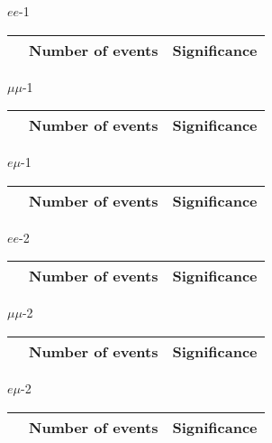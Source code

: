 \begin{frame}{$ee$-1}
\vspace{5mm}
\begin{tabular}{|c|c|c|}
\hline
& Number of events & Significance \\
\hline

\end{tabular}
\end{frame}

\begin{frame}{$\mu\mu$-1}
\vspace{5mm}
\begin{tabular}{|c|c|c|}
\hline
& Number of events & Significance \\
\hline

\end{tabular}
\end{frame}

\begin{frame}{$e\mu$-1}
\vspace{5mm}
\begin{tabular}{|c|c|c|}
\hline
& Number of events & Significance \\
\hline

\end{tabular}
\end{frame}

\begin{frame}{$ee$-2}
\vspace{5mm}
\begin{tabular}{|c|c|c|}
\hline
& Number of events & Significance \\
\hline

\end{tabular}
\end{frame}

\begin{frame}{$\mu\mu$-2}
\vspace{5mm}
\begin{tabular}{|c|c|c|}
\hline
& Number of events & Significance \\
\hline

\end{tabular}
\end{frame}

\begin{frame}{$e\mu$-2}
\vspace{5mm}
\begin{tabular}{|c|c|c|}
\hline
& Number of events & Significance \\
\hline

\end{tabular}
\end{frame}

